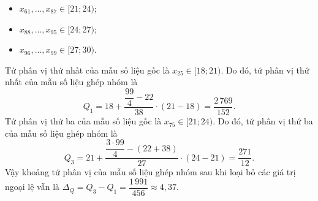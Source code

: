 \begin{ex}
{\begin{itemize}
			\item $x_{61}, \ldots, x_{87} \in[21; 24)$; 
			\item $x_{88}, \ldots,x_{95} \in[24; 27)$; 
			\item $x_{96}, \ldots,x_{99} \in[27; 30)$.
		\end{itemize}
		Tứ phân vị thứ nhất của mẫu số liệu gốc là $x_{25} \in[18; 21)$. Do đó, tứ phân vị thứ nhất của mẫu số liệu ghép nhóm là \[Q_1=18+\dfrac{\dfrac{99}{4}-22}{38} \cdot(21-18)=\dfrac{2\,769}{152}.\]
		Tứ phân vị thứ ba của mẫu số liệu gốc là $x_{75} \in[21; 24)$. Do đó, tứ phân vị thứ ba của mẫu số liệu ghép nhóm là \[Q_3=21+\dfrac{\dfrac{3 \cdot 99}{4}-(22+38)}{27} \cdot(24-21)=\dfrac{271}{12}.\]
		Vậy khoảng tứ phân vị của mẫu số liệu ghép nhóm sau khi loại bỏ các giá trị ngoại lệ vẫn là $\Delta_Q=Q_3-Q_1=\dfrac{1\,991}{456}\approx 4{,}37$. 
	}
\end{ex}
